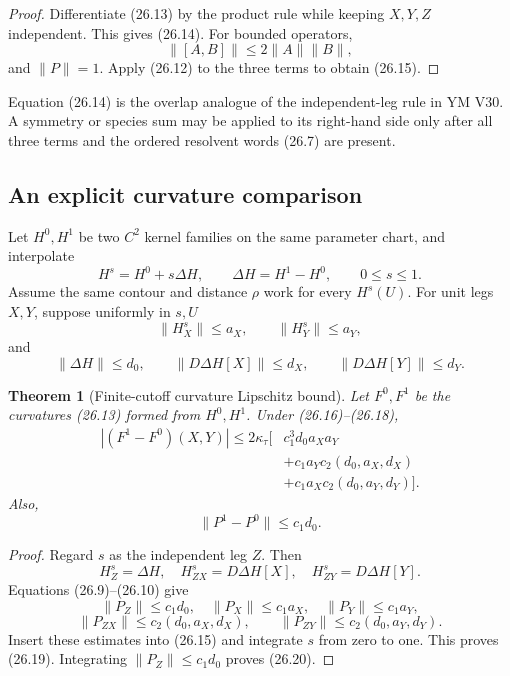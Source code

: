 \documentclass[11pt]{article}
\newtheorem{theorem}{Theorem}[section]
\begin{document}
\begin{proof}
Differentiate (26.13) by the product rule while keeping \(X,Y,Z\)
independent.  This gives (26.14).  For bounded operators,
\[
 \|[A,B]\|\leq2\|A\|\|B\|,
\]
and \(\|P\|=1\).  Apply (26.12) to the three terms to obtain (26.15).
\end{proof}

Equation (26.14) is the overlap analogue of the independent-leg rule in
YM V30.  A symmetry or species sum may be applied to its right-hand side
only after all three terms and the ordered resolvent words (26.7) are
present.

\subsection{An explicit curvature comparison}

Let \(H^0,H^1\) be two \(C^2\) kernel families on the same parameter
chart, and interpolate
\[
 H^s=H^0+s\Delta H,\qquad \Delta H=H^1-H^0,
 \qquad 0\leq s\leq1.
 \tag{26.16}
\]
Assume the same contour and distance \(\rho\) work for every \(H^s(U)\).
For unit legs \(X,Y\), suppose uniformly in \(s,U\)
\[
 \|H^s_X\|\leq a_X,\qquad
 \|H^s_Y\|\leq a_Y,
 \tag{26.17}
\]
and
\[
 \|\Delta H\|\leq d_0,\qquad
 \|D\Delta H[X]\|\leq d_X,\qquad
 \|D\Delta H[Y]\|\leq d_Y.
 \tag{26.18}
\]

\begin{theorem}[Finite-cutoff curvature Lipschitz bound]
\label{thm:v11v26-curvature-lipschitz}
Let \(F^0,F^1\) be the curvatures (26.13) formed from \(H^0,H^1\).
Under (26.16)--(26.18),
\[
 \begin{split}
 |(F^1-F^0)(X,Y)|
 \leq 2\kappa_\tau\bigl[
 &c_1^3d_0a_Xa_Y\\
 &+c_1a_Yc_2(d_0,a_X,d_X)\\
 &+c_1a_Xc_2(d_0,a_Y,d_Y)
 \bigr].
 \end{split}
 \tag{26.19}
\]
Also,
\[
 \|P^1-P^0\|\leq c_1d_0.
 \tag{26.20}
\]
\end{theorem}

\begin{proof}
Regard \(s\) as the independent leg \(Z\).  Then
\[
 H^s_Z=\Delta H,\quad
 H^s_{ZX}=D\Delta H[X],\quad
 H^s_{ZY}=D\Delta H[Y].
 \tag{26.21}
\]
Equations (26.9)--(26.10) give
\[
 \|P_Z\|\leq c_1d_0,\quad
 \|P_X\|\leq c_1a_X,\quad
 \|P_Y\|\leq c_1a_Y,
 \tag{26.22}
\]
\[
 \|P_{ZX}\|\leq c_2(d_0,a_X,d_X),\qquad
 \|P_{ZY}\|\leq c_2(d_0,a_Y,d_Y).
 \tag{26.23}
\]
Insert these estimates into (26.15) and integrate \(s\) from zero to
one.  This proves (26.19).  Integrating
\(\|P_Z\|\leq c_1d_0\) proves (26.20).
\end{proof}
\end{document}
